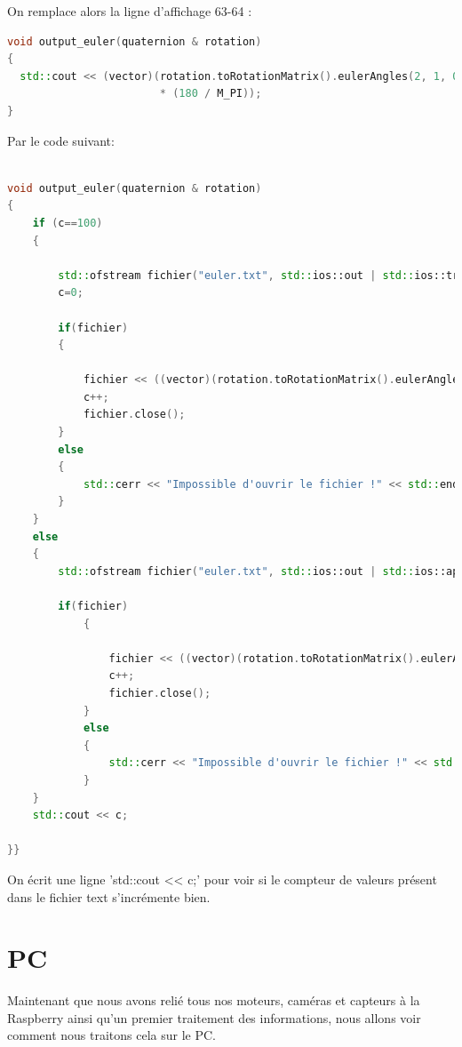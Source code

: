 \documentclass[a4paper,11pt]{report}
\begin{document}
				\newline On remplace alors la ligne d'affichage 63-64 :
				\begin{lstlisting}[language=c++]
void output_euler(quaternion & rotation)
{
  std::cout << (vector)(rotation.toRotationMatrix().eulerAngles(2, 1, 0)
                        * (180 / M_PI));
}
				\end{lstlisting}
				Par le code suivant:
				\begin{lstlisting}[language=c++]

void output_euler(quaternion & rotation)
{
	if (c==100)
	{
		
		std::ofstream fichier("euler.txt", std::ios::out | std::ios::trunc);
		c=0;
		
		if(fichier)
		{
				
			fichier << ((vector)(rotation.toRotationMatrix().eulerAngles(2, 1, 0) * (180 / M_PI)))[0] <<'/'<<((vector)(rotation.toRotationMatrix().eulerAngles(2, 1, 0) * (180 / M_PI)))[1]<<'/'<<((vector)(rotation.toRotationMatrix().eulerAngles(2, 1, 0) * (180 / M_PI)))[2] << std::endl;
			c++;
			fichier.close();
		}
		else
		{
			std::cerr << "Impossible d'ouvrir le fichier !" << std::endl;
		}
	}
	else
	{
		std::ofstream fichier("euler.txt", std::ios::out | std::ios::app);
	
		if(fichier)
			{
				
				fichier << ((vector)(rotation.toRotationMatrix().eulerAngles(2, 1, 0) * (180 / M_PI)))[0] <<'/'<<((vector)(rotation.toRotationMatrix().eulerAngles(2, 1, 0) * (180 / M_PI)))[1]<<'/'<<((vector)(rotation.toRotationMatrix().eulerAngles(2, 1, 0) * (180 / M_PI)))[2] << std::endl;
				c++;
				fichier.close();
			}
			else
			{
				std::cerr << "Impossible d'ouvrir le fichier !" << std::endl;
			}
	}
	std::cout << c;
  
}}
				\end{lstlisting}
				
		On écrit une ligne 'std::cout << c;' pour voir si le compteur de valeurs présent dans le fichier text s'incrémente bien.  
		\newpage
				
		
	\section{PC}
		Maintenant que nous avons relié tous nos moteurs, caméras et capteurs à la Raspberry ainsi qu'un premier traitement des informations, nous allons voir comment nous traitons cela sur le PC.
		
\end{document}
